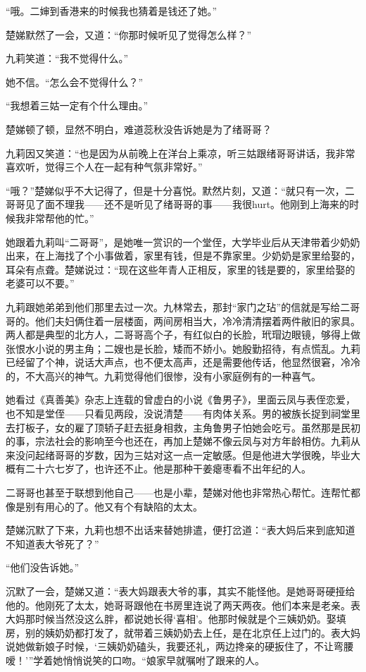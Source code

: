 \par “哦。二婶到香港来的时候我也猜着是钱还了她。”
\par 楚娣默然了一会，又道：“你那时候听见了觉得怎么样？”
\par 九莉笑道：“我不觉得什么。”
\par 她不信。“怎么会不觉得什么？”
\par “我想着三姑一定有个什么理由。”
\par 楚娣顿了顿，显然不明白，难道蕊秋没告诉她是为了绪哥哥？
\par 九莉因又笑道：“也是因为从前晚上在洋台上乘凉，听三姑跟绪哥哥讲话，我非常喜欢听，觉得三个人在一起有种气氛非常好。”
\par “哦？”楚娣似乎不大记得了，但是十分喜悦。默然片刻，又道：“就只有一次，二哥哥见了面不理我——还不是听见了绪哥哥的事——我很hurt。他刚到上海来的时候我非常帮他的忙。”
\par 她跟着九莉叫“二哥哥”，是她唯一赏识的一个堂侄，大学毕业后从天津带着少奶奶出来，在上海找了个小事做着，家里有钱，但是不靠家里。少奶奶是家里给娶的，耳朵有点聋。楚娣说过：“现在这些年青人正相反，家里的钱是要的，家里给娶的老婆可以不要。”
\par 九莉跟她弟弟到他们那里去过一次。九林常去，那封“家门之玷”的信就是写给二哥哥的。他们夫妇俩住着一层楼面，两间房相当大，冷冷清清摆着两件敝旧的家具。两人都是典型的北方人，二哥哥高个子，有红似白的长脸，玳瑁边眼镜，够得上做张恨水小说的男主角；二嫂也是长脸，矮而不娇小。她殷勤招待，有点慌乱。九莉已经留了个神，说话大声点，也不便太高声，还是需要他传话，他显然很窘，冷冷的，不大高兴的神气。九莉觉得他们很惨，没有小家庭例有的一种喜气。
\par 她看过《真善美》杂志上连载的曾虚白的小说《鲁男子》，里面云凤与表侄恋爱，也不知是堂侄——只看见两段，没说清楚——有肉体关系。男的被族长捉到祠堂里去打板子，女的雇了顶轿子赶去挺身相救，主角鲁男子怕她会吃亏。虽然那是民初的事，宗法社会的影响至今也还在，再加上楚娣不像云凤与对方年龄相仿。九莉从来没问起绪哥哥的岁数，因为三姑对这一点一定敏感。但是他进大学很晚，毕业大概有二十六七岁了，也许还不止。他是那种干姜瘪枣看不出年纪的人。
\par 二哥哥也甚至于联想到他自己——也是小辈，楚娣对他也非常热心帮忙。连帮忙都像是别有用心的了。他又有个有缺陷的太太。
\par 楚娣沉默了下来，九莉也想不出话来替她排遣，便打岔道：“表大妈后来到底知道不知道表大爷死了？”
\par “他们没告诉她。”
\par 沉默了一会，楚娣又道：“表大妈跟表大爷的事，其实不能怪他。是她哥哥硬挜给他的。他刚死了太太，她哥哥跟他在书房里连说了两天两夜。他们本来是老亲。表大妈那时候当然没这么胖，都说她长得‘喜相’。他那时候就是个三姨奶奶。娶填房，别的姨奶奶都打发了，就带着三姨奶奶去上任，是在北京任上过门的。表大妈说她做新娘子时候，‘三姨奶奶磕头，我要还礼，两边搀亲的硬扳住了，不让弯腰嗳！'”学着她悄悄说笑的口吻。“娘家早就嘱咐了跟来的人。
